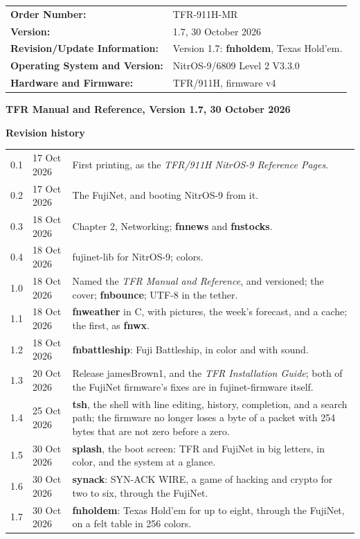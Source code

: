 \documentclass[10pt,twoside,openany]{book}
\newcommand{\docversion}{1.7}
\newcommand{\docdate}{30 October 2026}
\newcommand{\cmd}[1]{\textbf{#1}}            %
\begin{document}
\vspace{0.2in}
{\sffamily
\begin{tabular}{@{}l l@{}}
\bfseries Order Number: & TFR-911H-MR\\[3pt]
\bfseries Version: & \docversion, \docdate\\[3pt]
\bfseries Revision/Update Information: & Version \docversion: \cmd{fnholdem}, Texas Hold'em.\\[3pt]
\bfseries Operating System and Version: & NitrOS-9/6809 Level 2 V3.3.0\\[3pt]
\bfseries Hardware and Firmware: & TFR/911H, firmware v4\\
\end{tabular}\par}
\vspace*{\fill}
{\small
\textbf{TFR Manual and Reference, Version \docversion, \docdate}

\textbf{Revision history}\\[2pt]
\begin{tabular}{@{}l l p{3.9in}@{}}
0.1 & 17 Oct 2026 & First printing, as the \emph{TFR/911H NitrOS-9
Reference Pages}.\\
0.2 & 17 Oct 2026 & The FujiNet, and booting NitrOS-9 from it.\\
0.3 & 18 Oct 2026 & Chapter 2, Networking; \cmd{fnnews} and \cmd{fnstocks}.\\
0.4 & 18 Oct 2026 & fujinet-lib for NitrOS-9; colors.\\
1.0 & 18 Oct 2026 & Named the \emph{TFR Manual and Reference}, and
versioned; the cover; \cmd{fnbounce}; UTF-8 in the tether.\\
1.1 & 18 Oct 2026 & \cmd{fnweather} in C, with pictures, the week's
forecast, and a cache; the first, as \cmd{fnwx}.\\
1.2 & 18 Oct 2026 & \cmd{fnbattleship}: Fuji Battleship, in color and
with sound.\\
1.3 & 20 Oct 2026 & Release jamesBrown1, and the \emph{TFR Installation
Guide}; both of the FujiNet firmware's fixes are in fujinet-firmware
itself.\\
1.4 & 25 Oct 2026 & \cmd{tsh}, the shell with line editing, history,
completion, and a search path; the firmware no longer loses a byte of a
packet with 254 bytes that are not zero before a zero.\\
1.5 & 30 Oct 2026 & \cmd{splash}, the boot screen: TFR and FujiNet in big
letters, in color, and the system at a glance.\\
1.6 & 30 Oct 2026 & \cmd{synack}: SYN-ACK WIRE, a game of hacking and
crypto for two to six, through the FujiNet.\\
1.7 & 30 Oct 2026 & \cmd{fnholdem}: Texas Hold'em for up to eight,
through the FujiNet, on a felt table in 256 colors.\\
\end{tabular}

}
\end{document}
